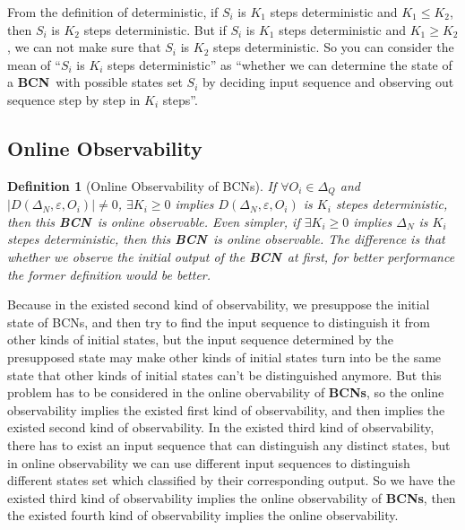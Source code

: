 \documentclass[letterpaper, 10 pt, conference]{ieeeconf}  %
\newtheorem{definition}{Definition}
\def \BCN {{\bf BCN}}
\begin{document}
From the definition of deterministic, if $S_i$ is $K_1$ steps deterministic and $K_1\leq K_2$, then $S_i$ is $K_2$ steps deterministic. But if $S_i$ is $K_1$ steps deterministic and $K_1\geq K_2$, we can not make sure that $S_i$ is $K_2$ steps deterministic. So you can consider the mean of ``$S_i$ is $K_i$ steps deterministic'' as ``whether we can determine the state of a \BCN\ with possible states set $S_i$ by deciding input sequence and observing out sequence step by step in $K_i$ steps''.
\subsection{Online Observability}
\begin{definition}[Online Observability of  BCNs]
If $\forall  O_i\in \Delta_Q$ and $|D\left(\Delta_N,\varepsilon, O_i\right)|\neq 0$, $\exists K_i \ge 0$ implies $D\left(\Delta_N,\varepsilon,O_i\right)$ is $K_i$ stepes deterministic, then this \BCN\ is online observable. Even simpler, if $\exists K_i \ge 0$ implies $\Delta_N$ is $K_i$ stepes deterministic, then this \BCN\ is online observable. The difference is that whether we observe the initial output of the \BCN\ at first, for better performance the former definition would be better.
\end{definition}

Because in the existed second kind of observability, we presuppose the initial state of BCNs, and then try to find the input sequence to distinguish it from other kinds of initial states, but the input sequence determined by the presupposed state may make other kinds of initial states turn into be the same state that other kinds of initial states can't be distinguished anymore. But this problem has to be considered in the online obervability of {\bf BCNs}, so the online observability implies the existed first kind of observability, and then implies the existed second kind of observability. In the existed third kind of observability, there has to exist an input sequence that can distinguish any distinct states, but in online observability we can use different input sequences to distinguish different states set which classified by their corresponding output. So we have the existed third kind of observability implies the online observability of {\bf BCNs}, then the existed fourth kind of observability implies the online observability.
\end{document}
